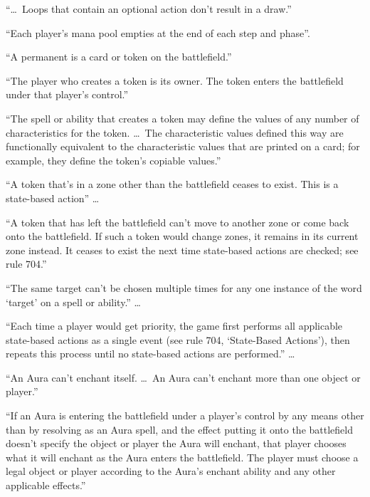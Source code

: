 \documentclass[11pt]{article}
\theoremstyle{definition}
\begin{document}
\begingroup\footnotesize
\begin{description}[leftmargin=1em,itemsep=1pt,parsep=0pt]
\item[104.4b] ``\dots\ Loops that contain an optional action don't result in a draw.''
\item[106.4] ``Each player's mana pool empties at the end of each step and phase''.
\item[110.1] ``A permanent is a card or token on the battlefield.''
\item[111.2] ``The player who creates a token is its owner. The token enters the battlefield
  under that player's control.''
\item[111.3] ``The spell or ability that creates a token may define the values of any number
  of characteristics for the token. \dots\ The characteristic values defined this way are
  functionally equivalent to the characteristic values that are printed on a card; for
  example, they define the token's copiable values.''
\item[111.7] ``A token that's in a zone other than the battlefield ceases to exist. This is a
  state-based action'' \dots
\item[111.8] ``A token that has left the battlefield can't move to another zone or come back
  onto the battlefield. If such a token would change zones, it remains in its current zone
  instead. It ceases to exist the next time state-based actions are checked; see rule
  704.''
\item[115.3] ``The same target can't be chosen multiple times for any one instance of the
  word `target' on a spell or ability.'' \dots
\item[117.5] ``Each time a player would get priority, the game first performs all applicable
  state-based actions as a single event (see rule 704, `State-Based Actions'), then repeats
  this process until no state-based actions are performed.'' \dots
\item[303.4d] ``An Aura can't enchant itself. \dots\ An Aura can't enchant more than one object
  or player.''
\item[303.4f] ``If an Aura is entering the battlefield under a player's control by any means
  other than by resolving as an Aura spell, and the effect putting it onto the battlefield
  doesn't specify the object or player the Aura will enchant, that player chooses what it
  will enchant as the Aura enters the battlefield. The player must choose a legal object or
  player according to the Aura's enchant ability and any other applicable effects.''

\end{description}
\end{document}
